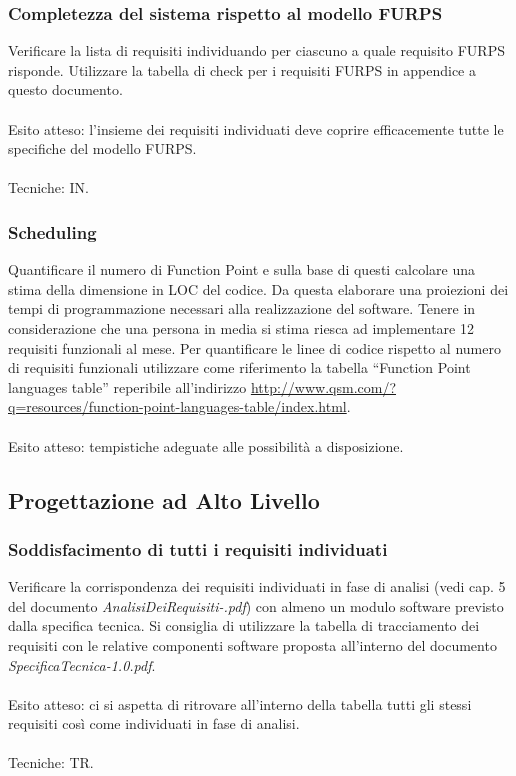 \subsubsection{Completezza del sistema rispetto al modello FURPS}

Verificare la lista di requisiti individuando per ciascuno a quale requisito
FURPS risponde. Utilizzare la tabella di check per i requisiti FURPS in
appendice a questo documento.
\\\\
Esito atteso: l'insieme dei requisiti individuati deve coprire
efficacemente tutte le specifiche del modello FURPS.
\\\\ Tecniche: IN.

\subsubsection{Scheduling}

Quantificare il numero di Function Point e sulla base di questi calcolare una
stima della dimensione in LOC del codice. Da questa elaborare una proiezioni dei
tempi di programmazione necessari alla realizzazione del software. Tenere in
considerazione che una persona in media si stima riesca ad implementare 12
requisiti funzionali al mese. Per quantificare le linee di codice
rispetto al numero di requisiti funzionali utilizzare come riferimento la
tabella ``Function Point languages table'' reperibile all'indirizzo
\url{http://www.qsm.com/?q=resources/function-point-languages-table/index.html}.
\\\\
Esito atteso: tempistiche adeguate alle possibilit\`a a disposizione.


\subsection{Progettazione ad Alto Livello}

\subsubsection{Soddisfacimento di tutti i requisiti individuati}

Verificare la corrispondenza dei requisiti individuati in fase di analisi (vedi
cap. 5 del documento \emph{AnalisiDeiRequisiti-\versioneAR.pdf}) con almeno un modulo
software previsto dalla specifica tecnica. Si consiglia di utilizzare la tabella di tracciamento dei requisiti con le relative componenti
software proposta all'interno del documento \emph{SpecificaTecnica-1.0.pdf}.
\\\\
Esito atteso: ci si aspetta di ritrovare all'interno della tabella tutti gli
stessi requisiti cos\`i come individuati in fase di analisi.
\\\\
Tecniche: TR.
